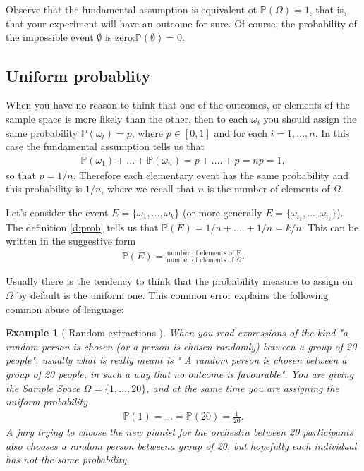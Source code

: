 \documentclass[12pt]{article}
\newtheorem{example}[theorem]{Example}
\newcommand{\<}{{\langle \!\! \langle}}
\renewcommand{\>}{{\rangle \!\! \rangle}}
\newcommand{\bel}[2]{\begin{equation} \label{#1} \begin{split} #2
 					\end{split} \end{equation}}
\begin{document}
	Observe that the fundamental assumption is equivalent ot $\mathbb{P}(\Omega)=1$, that is, that your experiment will have an outcome for sure. Of course, the probability of the impossible event $\emptyset$ is zero:$ \mathbb{P}(\emptyset)=0$. 

	\subsection{Uniform probablity }
	When you have no reason to think that one of the outcomes, or elements of the sample space is more likely than the other, then to each $\omega_i$ you should assign the same probability $\mathbb{P}(\omega_i)=p$, where $p\in [0,1]$ and for each $i=1,...,n$. 
	In this case the fundamental assumption tells us that 
	\bel{}{\mathbb{P}(\omega_1)+...+\mathbb{P}(\omega_n)=p+....+p= np =1,}
	so that $p=1/n$. Therefore each elementary event has the same probability and this probability is $1/n$, where we recall that $n$ is the number of elements of $\Omega$. 



	Let's consider the event $E=\{\omega_1,...,\omega_k\}$ (or more generally $E=\{\omega_{i_1},...,\omega_{i_k}\}$). The definition  \eqref{d:prob} tells us that $\mathbb{P}(E)=1/n+....+1/n=k/n$. This can be written in the suggestive form 
	\bel{}{
		\mathbb{P}(E)=\frac{\textrm{number of elements of E}}{\textrm{number of elements of $\Omega$}}.}

	Usually there is the tendency to think that the probability measure to assign on $\Omega$ by default is the uniform one. This common error explains the following common abuse of lenguage:  
	

	\begin{example}[ Random extractions ]
		When you read expressions of the kind "a random person is chosen (or a person is chosen randomly) between a group of 20 people", usually what is really meant is " A random person is chosen between a group of 20 people, in such a way that no outcome is favourable". You are giving the Sample Space $\Omega=\{1,...,20\}$, and at the same time you are assigning the  uniform probability 
\bel{e:ru}{\mathbb{P}(1)=...=\mathbb{P}(20)=\frac{1}{20}.}
 A jury trying to choose the new pianist for the orchestra between 20 participants also chooses a random person betweena group of 20, but hopefully each individual has not the same probability. 

\end{example}
\end{document}
